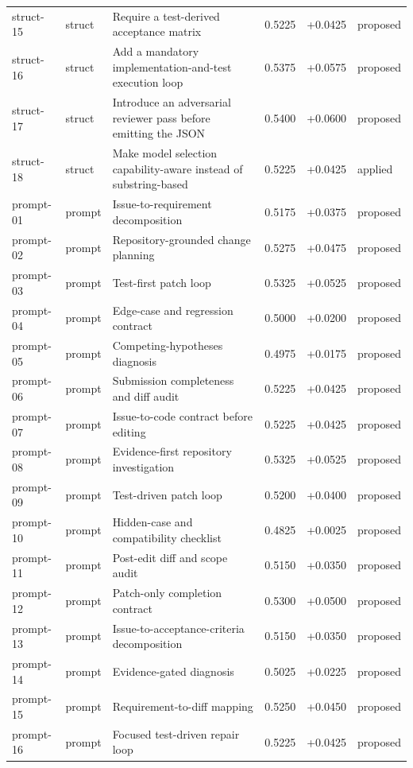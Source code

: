 \begin{center}
\begin{longtable}{llp{5.2cm}rrl}
struct-15 & struct & Require a test-derived acceptance matrix & 0.5225 & +0.0425 & proposed \\
struct-16 & struct & Add a mandatory implementation-and-test execution loop & 0.5375 & +0.0575 & proposed \\
struct-17 & struct & Introduce an adversarial reviewer pass before emitting the JSON & 0.5400 & +0.0600 & proposed \\
struct-18 & struct & Make model selection capability-aware instead of substring-based & 0.5225 & +0.0425 & applied \\
prompt-01 & prompt & Issue-to-requirement decomposition & 0.5175 & +0.0375 & proposed \\
prompt-02 & prompt & Repository-grounded change planning & 0.5275 & +0.0475 & proposed \\
prompt-03 & prompt & Test-first patch loop & 0.5325 & +0.0525 & proposed \\
prompt-04 & prompt & Edge-case and regression contract & 0.5000 & +0.0200 & proposed \\
prompt-05 & prompt & Competing-hypotheses diagnosis & 0.4975 & +0.0175 & proposed \\
prompt-06 & prompt & Submission completeness and diff audit & 0.5225 & +0.0425 & proposed \\
prompt-07 & prompt & Issue-to-code contract before editing & 0.5225 & +0.0425 & proposed \\
prompt-08 & prompt & Evidence-first repository investigation & 0.5325 & +0.0525 & proposed \\
prompt-09 & prompt & Test-driven patch loop & 0.5200 & +0.0400 & proposed \\
prompt-10 & prompt & Hidden-case and compatibility checklist & 0.4825 & +0.0025 & proposed \\
prompt-11 & prompt & Post-edit diff and scope audit & 0.5150 & +0.0350 & proposed \\
prompt-12 & prompt & Patch-only completion contract & 0.5300 & +0.0500 & proposed \\
prompt-13 & prompt & Issue-to-acceptance-criteria decomposition & 0.5150 & +0.0350 & proposed \\
prompt-14 & prompt & Evidence-gated diagnosis & 0.5025 & +0.0225 & proposed \\
prompt-15 & prompt & Requirement-to-diff mapping & 0.5250 & +0.0450 & proposed \\
prompt-16 & prompt & Focused test-driven repair loop & 0.5225 & +0.0425 & proposed \\

\end{longtable}
\end{center}
